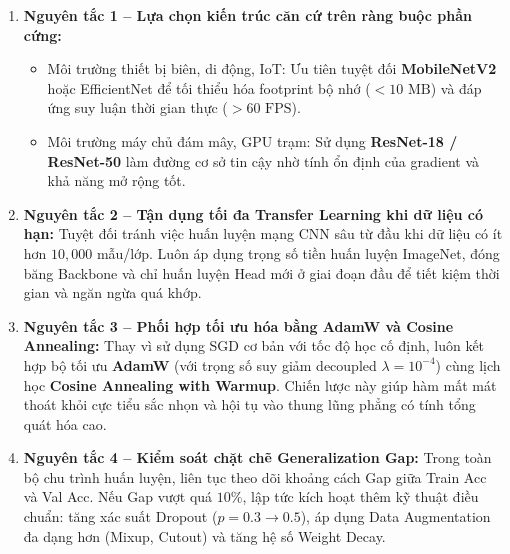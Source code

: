 \documentclass[12pt,a4paper]{report}
\begin{document}
\begin{enumerate}[noitemsep,topsep=2pt,leftmargin=*]
    \item \textbf{Nguyên tắc 1 -- Lựa chọn kiến trúc căn cứ trên ràng buộc phần cứng:}
    \begin{itemize}[noitemsep,topsep=1pt,leftmargin=1.5em]
        \item Môi trường thiết bị biên, di động, IoT: Ưu tiên tuyệt đối \textbf{MobileNetV2} hoặc EfficientNet để tối thiểu hóa footprint bộ nhớ ($<10\text{ MB}$) và đáp ứng suy luận thời gian thực ($>60\text{ FPS}$).
        \item Môi trường máy chủ đám mây, GPU trạm: Sử dụng \textbf{ResNet-18 / ResNet-50} làm đường cơ sở tin cậy nhờ tính ổn định của gradient và khả năng mở rộng tốt.
    \end{itemize}
    \item \textbf{Nguyên tắc 2 -- Tận dụng tối đa Transfer Learning khi dữ liệu có hạn:}
    Tuyệt đối tránh việc huấn luyện mạng CNN sâu từ đầu khi dữ liệu có ít hơn $10,000$ mẫu/lớp. Luôn áp dụng trọng số tiền huấn luyện ImageNet, đóng băng Backbone và chỉ huấn luyện Head mới ở giai đoạn đầu để tiết kiệm thời gian và ngăn ngừa quá khớp.
    \item \textbf{Nguyên tắc 3 -- Phối hợp tối ưu hóa bằng AdamW và Cosine Annealing:}
    Thay vì sử dụng SGD cơ bản với tốc độ học cố định, luôn kết hợp bộ tối ưu \textbf{AdamW} (với trọng số suy giảm decoupled $\lambda = 10^{-4}$) cùng lịch học \textbf{Cosine Annealing with Warmup}. Chiến lược này giúp hàm mất mát thoát khỏi cực tiểu sắc nhọn và hội tụ vào thung lũng phẳng có tính tổng quát hóa cao.
    \item \textbf{Nguyên tắc 4 -- Kiểm soát chặt chẽ Generalization Gap:}
    Trong toàn bộ chu trình huấn luyện, liên tục theo dõi khoảng cách Gap giữa Train Acc và Val Acc. Nếu Gap vượt quá $10\%$, lập tức kích hoạt thêm kỹ thuật điều chuẩn: tăng xác suất Dropout ($p=0.3 \to 0.5$), áp dụng Data Augmentation đa dạng hơn (Mixup, Cutout) và tăng hệ số Weight Decay.
\end{enumerate}

\end{document}
